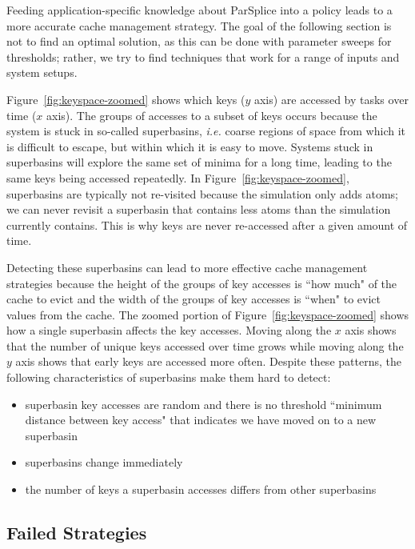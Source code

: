 Feeding application-specific knowledge about ParSplice into a policy
leads to a more accurate cache management strategy.  The goal of the following
section is not to find an optimal solution, as this can be done with parameter
sweeps for thresholds; rather, we try to find techniques that work for a range
of inputs and system setups.

Figure~\ref{fig:keyspace-zoomed} shows which keys (\(y\) axis) are accessed by
tasks over time (\(x\) axis). The groups of accesses to a subset of keys occurs
because the system is stuck in so-called superbasins, {\it i.e.} coarse regions of space from
which it is difficult to escape, but within which it is easy to move. Systems
stuck in superbasins will explore the same set of minima for a
long time, leading to the same keys being accessed repeatedly. In
Figure~\ref{fig:keyspace-zoomed}, superbasins are typically not re-visited because the
simulation only adds atoms; we can never revisit a superbasin that contains less atoms
than the simulation currently contains.
This is why keys are never re-accessed after a given amount of time.

Detecting these superbasins can lead to more effective cache management
strategies because the height of the groups of key accesses is ``how much" of
the cache to evict and the width of the groups of key accesses is ``when" to
evict values from the cache.  The zoomed portion of
Figure~\ref{fig:keyspace-zoomed} shows how a single superbasin affects the key
accesses. Moving along the \(x\) axis shows that the number of unique keys
accessed over time grows while moving along the \(y\) axis shows that early
keys are accessed more often.  Despite these patterns, the following
characteristics of superbasins make them hard to detect:

\begin{itemize}

  \item superbasin key accesses are random and there is no threshold ``minimum distance
  between key access" that indicates we have moved on to a new superbasin

  \item superbasins change immediately

  \item the number of keys a superbasin accesses differs from other superbasins

\end{itemize}

\subsection{Failed Strategies}

